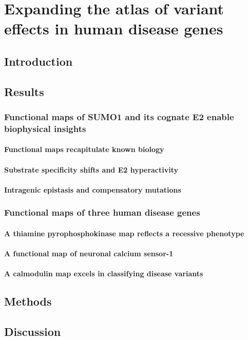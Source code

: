
\chapter{Expanding the atlas of variant effects in human disease genes}

\section{Introduction}

\section{Results}

\subsection{Functional maps of SUMO1 and its cognate E2 enable biophysical insights}

\subsubsection{Functional maps recapitulate known biology}

\subsubsection{Substrate specificity shifts and E2 hyperactivity}

\subsubsection{Intragenic epistasis and compensatory mutations}

\subsection{Functional maps of three human disease genes}

\subsubsection{A thiamine pyrophosphokinase map reflects a recessive phenotype}

\subsubsection{A functional map of neuronal calcium sensor-1}

\subsubsection{A calmodulin map excels in classifying disease variants}

\section{Methods}

\section{Discussion}

